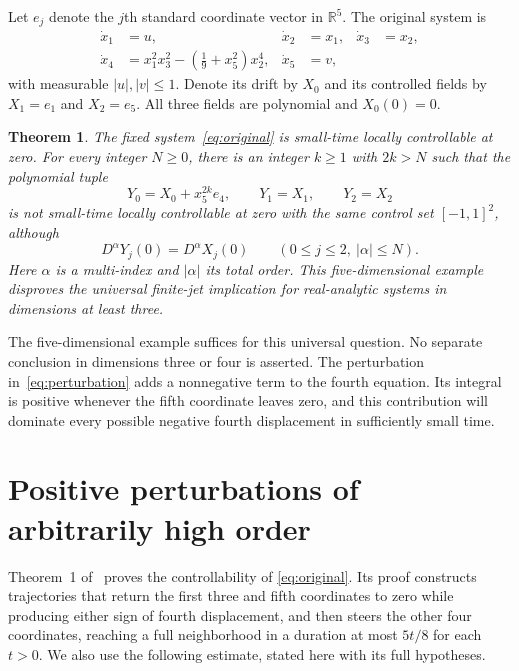\documentclass[11pt,a4paper]{article}
\newtheorem{theorem}{Theorem}
\newcommand{\R}{\mathbb{R}}
\begin{document}
Let $e_j$ denote the $j$th standard coordinate vector in $\R^5$.
The original system is
\begin{equation}\label{eq:original}
\begin{aligned}
 \dot x_1&=u, & \dot x_2&=x_1, & \dot x_3&=x_2,\\
 \dot x_4&=x_1^2x_3^2-\left(\frac19+x_5^2\right)x_2^4,
 &\dot x_5&=v,
\end{aligned}
\end{equation}
with measurable $|u|,|v|\le1$.
Denote its drift by $X_0$ and its controlled fields by $X_1=e_1$ and
$X_2=e_5$. All three fields are polynomial and $X_0(0)=0$.

\begin{theorem}\label{thm:main}
The fixed system~\eqref{eq:original} is small-time locally controllable at
zero. For every integer $N\ge0$, there is an integer $k\ge1$ with $2k>N$
such that the polynomial tuple
\begin{equation}\label{eq:perturbation}
 Y_0=X_0+x_5^{2k}e_4,\qquad Y_1=X_1,\qquad Y_2=X_2
\end{equation}
is not small-time locally controllable at zero with the same control set
$[-1,1]^2$, although
\[
 D^\alpha Y_j(0)=D^\alpha X_j(0)
 \qquad (0\le j\le2,\ |\alpha|\le N).
\]
Here $\alpha$ is a multi-index and $|\alpha|$ its total order.
This five-dimensional example disproves the universal finite-jet
implication for real-analytic systems in dimensions at least three.
\end{theorem}

The five-dimensional example suffices for this universal question.
No separate conclusion in dimensions three or four is asserted.
The perturbation in~\eqref{eq:perturbation} adds a nonnegative term to the
fourth equation. Its integral is positive whenever the fifth coordinate
leaves zero, and this contribution will dominate every possible negative fourth
displacement in sufficiently small time.

\section{Positive perturbations of arbitrarily high order}

Theorem~1 of~\cite{Jin} proves the controllability of
\eqref{eq:original}. Its proof constructs trajectories that return the first three and fifth
coordinates to zero while producing either sign of fourth displacement,
and then steers the other four coordinates,
reaching a full neighborhood in a duration at most $5t/8$ for each $t>0$.
We also use the following estimate, stated here with its full hypotheses.
\end{document}
